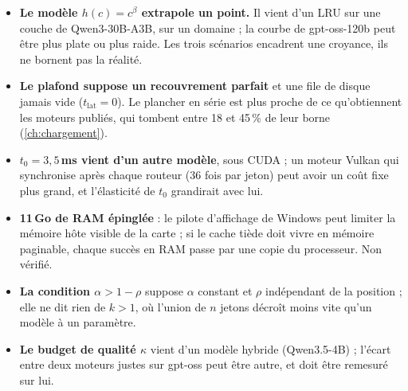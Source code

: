 \begin{faux}
\begin{itemize}
\item \textbf{Le modèle $h(c) = c^\beta$ extrapole un point.} Il vient d'un LRU sur une couche de Qwen3-30B-A3B, sur un domaine ; la courbe de gpt-oss-120b peut être plus plate ou plus raide. Les trois scénarios encadrent une croyance, ils ne bornent pas la réalité.
\item \textbf{Le plafond suppose un recouvrement parfait} et une file de disque jamais vide ($t_{\mathrm{lat}} = 0$). Le plancher en série est plus proche de ce qu'obtiennent les moteurs publiés, qui tombent entre 18 et 45\,\% de leur borne (\cref{ch:chargement}).
\item \textbf{$t_0 = 3{,}5$\,ms vient d'un autre modèle}, sous CUDA ; un moteur Vulkan qui synchronise après chaque routeur (36 fois par jeton) peut avoir un coût fixe plus grand, et l'élasticité de $t_0$ grandirait avec lui.
\item \textbf{11\,Go de RAM épinglée} : le pilote d'affichage de Windows peut limiter la mémoire hôte visible de la carte ; si le cache tiède doit vivre en mémoire paginable, chaque succès en RAM passe par une copie du processeur. Non vérifié.
\item \textbf{La condition $\alpha > 1 - \rho$} suppose $\alpha$ constant et $\rho$ indépendant de la position ; elle ne dit rien de $k > 1$, où l'union de $n$ jetons décroît moins vite qu'un modèle à un paramètre.
\item \textbf{Le budget de qualité $\kappa$} vient d'un modèle hybride (Qwen3.5-4B) ; l'écart entre deux moteurs justes sur gpt-oss peut être autre, et doit être remesuré sur lui.
\end{itemize}
\end{faux}
